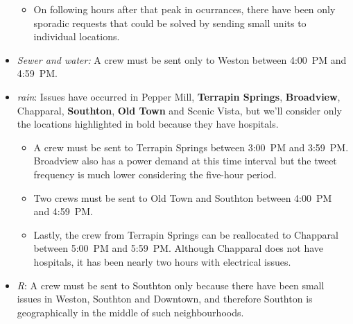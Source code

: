 \begin{itemize}
\begin{itemize}
\item On following hours after that peak in ocurrances, there have been only sporadic
requests that could be solved by sending small units to individual locations.
 \end{itemize} 
\item \emph{Sewer and water:} A crew must be sent only to Weston between 4:00~PM and 4:59~PM.                                                          
     \smallskip                                                                   
     \item \emph{rain}: Issues have occurred in Pepper Mill, \textbf{Terrapin    
     Springs}, \textbf{Broadview}, Chapparal, \textbf{Southton}, \textbf{Old      
     Town} and Scenic Vista, but we'll consider only the locations                
     highlighted in bold because they have hospitals.                             
     \begin{itemize}                                                              
         \item A crew must be sent to Terrapin Springs between 3:00~PM and        
         3:59~PM. Broadview also has a power demand at this time interval but the 
         tweet frequency is much lower considering the five-hour period.                           \item Two crews must be sent to Old Town and Southton between 4:00~PM    
         and 4:59~PM.                                                             
         \item Lastly, the crew from Terrapin Springs can be reallocated to                Chapparal between 5:00~PM and 5:59~PM. Although Chapparal does not have  
         hospitals, it has been nearly two hours with electrical issues.          
     \end{itemize}                                                                
     \item \emph{R}: A crew must be sent to Southton only   
     because there have been small issues in Weston, Southton and Downtown, and   
     therefore Southton is geographically in the middle of such neighbourhoods.   
 \end{itemize}   

